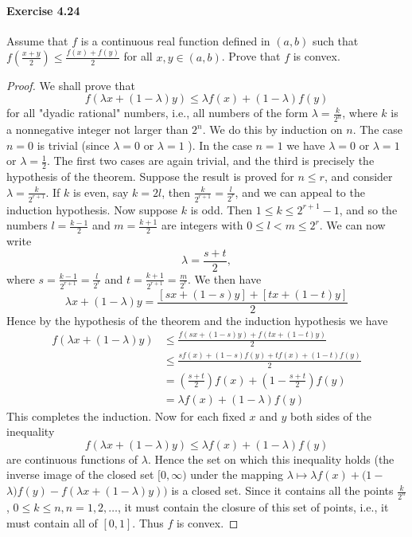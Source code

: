 \documentclass{article}
\theoremstyle{definition}
\begin{document}
\paragraph{Exercise 4.24} Assume that $f$ is a continuous real function defined in $(a, b)$ such that $f\left(\frac{x+y}{2}\right) \leq \frac{f(x)+f(y)}{2}$ for all $x, y \in(a, b)$. Prove that $f$ is convex.
\begin{proof}
    We shall prove that
$$
f(\lambda x+(1-\lambda) y) \leq \lambda f(x)+(1-\lambda) f(y)
$$
for all "dyadic rational" numbers, i.e., all numbers of the form $\lambda=\frac{k}{2^n}$, where $k$ is a nonnegative integer not larger than $2^n$. We do this by induction on $n$. The case $n=0$ is trivial (since $\lambda=0$ or $\lambda=1$ ). In the case $n=1$ we have $\lambda=0$ or $\lambda=1$ or $\lambda=\frac{1}{2}$. The first two cases are again trivial, and the third is precisely the hypothesis of the theorem. Suppose the result is proved for $n \leq r$, and consider $\lambda=\frac{k}{2^{r+1}}$. If $k$ is even, say $k=2 l$, then $\frac{k}{2^{r+1}}=\frac{l}{2^r}$, and we can appeal to the induction hypothesis. Now suppose $k$ is odd. Then $1 \leq k \leq 2^{r+1}-1$, and so the numbers $l=\frac{k-1}{2}$ and $m=\frac{k+1}{2}$ are integers with $0 \leq l<m \leq 2^r$. We can now write
$$
\lambda=\frac{s+t}{2},
$$
where $s=\frac{k-1}{2^{r+1}}=\frac{l}{2^r}$ and $t=\frac{k+1}{2^{r+1}}=\frac{m}{2^r}$. We then have
$$
\lambda x+(1-\lambda) y=\frac{[s x+(1-s) y]+[t x+(1-t) y]}{2}
$$
Hence by the hypothesis of the theorem and the induction hypothesis we have
$$
\begin{aligned}
f(\lambda x+(1-\lambda) y) & \leq \frac{f(s x+(1-s) y)+f(t x+(1-t) y)}{2} \\
& \leq \frac{s f(x)+(1-s) f(y)+t f(x)+(1-t) f(y)}{2} \\
&=\left(\frac{s+t}{2}\right) f(x)+\left(1-\frac{s+t}{2}\right) f(y) \\
&=\lambda f(x)+(1-\lambda) f(y)
\end{aligned}
$$
This completes the induction.
Now for each fixed $x$ and $y$ both sides of the inequality
$$
f(\lambda x+(1-\lambda) y) \leq \lambda f(x)+(1-\lambda) f(y)
$$
are continuous functions of $\lambda$. Hence the set on which this inequality holds (the inverse image of the closed set $[0, \infty)$ under the mapping $\lambda \mapsto \lambda f(x)+(1-$ $\lambda) f(y)-f(\lambda x+(1-\lambda) y))$ is a closed set. Since it contains all the points $\frac{k}{2^n}$, $0 \leq k \leq n, n=1,2, \ldots$, it must contain the closure of this set of points, i.e., it must contain all of $[0,1]$. Thus $f$ is convex.
\end{proof}
\end{document}
